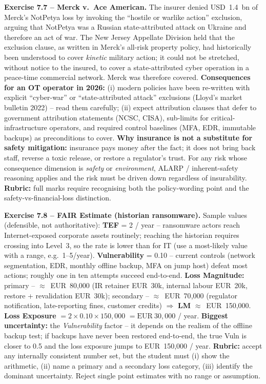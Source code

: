 \documentclass[11pt,a4paper]{article}
\begin{document}
\begin{solutionbox}
\textbf{Exercise 7.7 -- Merck v.\ Ace American.}
The insurer denied USD~1.4~bn of Merck's NotPetya loss by invoking the
``hostile or warlike action'' exclusion, arguing that NotPetya was a
Russian state-attributed attack on Ukraine and therefore an act of war.
The New Jersey Appellate Division held that the exclusion clause, as
written in Merck's all-risk property policy, had historically been
understood to cover \emph{kinetic} military action; it could not be
stretched, without notice to the insured, to cover a state-attributed
cyber operation in a peace-time commercial network. Merck was therefore
covered.
\textbf{Consequences for an OT operator in 2026:} (i) modern policies have
been re-written with explicit ``cyber-war'' or
``state-attributed attack'' exclusions (Lloyd's market bulletin 2022)
-- read them carefully; (ii) expect attribution clauses that defer to
government attribution statements (NCSC, CISA), sub-limits for
critical-infrastructure operators, and required control baselines
(MFA, EDR, immutable backups) as preconditions to cover.
\textbf{Why insurance is not a substitute for safety mitigation:}
insurance pays money after the fact; it does not bring back staff,
reverse a toxic release, or restore a regulator's trust. For any
risk whose consequence dimension is \emph{safety} or
\emph{environment}, ALARP / inherent-safety reasoning applies and the
risk must be driven down regardless of insurability.
\textbf{Rubric:} full marks require recognising both the policy-wording
point and the safety-vs-financial-loss distinction.
\end{solutionbox}

\begin{solutionbox}
\textbf{Exercise 7.8 -- FAIR Estimate (historian ransomware).}
Sample values (defensible, not authoritative):
\textbf{TEF} = 2 / year -- ransomware actors reach Internet-exposed
corporate assets routinely; reaching the historian requires crossing
into Level~3, so the rate is lower than for IT (use a most-likely value
with a range, e.g.\ 1--5/year).
\textbf{Vulnerability} = 0.10 -- current controls (network segmentation,
EDR, monthly offline backup, MFA on jump host) defeat most actions;
roughly one in ten attempts succeed end-to-end.
\textbf{Loss Magnitude:} primary -- $\approx$~EUR~80{,}000
(IR retainer EUR~30k, internal labour EUR~20k, restore + revalidation
EUR~30k); secondary -- $\approx$~EUR~70{,}000 (regulator notification,
late-reporting fines, customer credits) $\Rightarrow$ \textbf{LM}
$\approx$~EUR~150{,}000.
\textbf{Loss Exposure} $= 2 \times 0.10 \times 150{,}000$
$= \text{EUR}~30{,}000$ / year.
\textbf{Biggest uncertainty:} the \emph{Vulnerability} factor -- it
depends on the realism of the offline backup test; if backups have
never been restored end-to-end, the true Vuln is closer to 0.5 and the
loss exposure jumps to EUR~150{,}000 / year.
\textbf{Rubric:} accept any internally consistent number set, but the
student must (i) show the arithmetic, (ii) name a primary and a
secondary loss category, (iii) identify the dominant uncertainty.
Reject single point estimates with no range or assumption.
\end{solutionbox}
\end{document}
